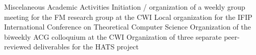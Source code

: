 
\begin{rubric}{Miscelaneous Academic Activities}
		Initiation / organization of a weekly group meeting for the FM research group at the CWI
		Local organization for the  IFIP International Conference on Theoretical Computer Science
		Organization of the biweekly ACG colloquium at the CWI
		Organization of three separate peer-reviewed deliverables for the HATS project
\end{rubric}
